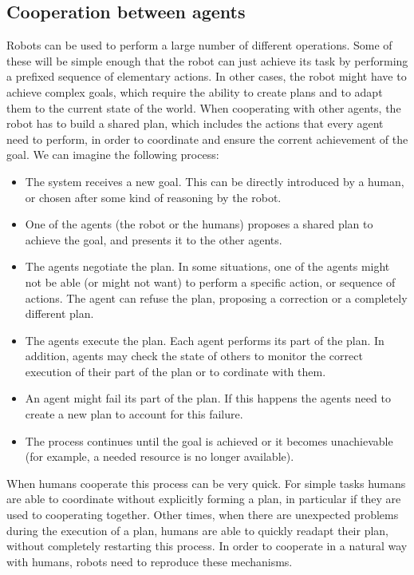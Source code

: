\subsection{Cooperation between agents}
Robots can be used to perform a large number of different operations. Some of these will be simple enough that the robot can just achieve its task by performing a prefixed sequence of elementary actions. In other cases, the robot might have to achieve complex goals, which require the ability to create plans and to adapt them to the current state of the world. When cooperating with other agents, the robot has to build a shared plan, which includes the actions that every agent need to perform, in order to coordinate and ensure the corrent achievement of the goal. We can imagine the following process:
\begin{itemize}
	\item The system receives a new goal. This can be directly introduced by a human, or chosen after some kind of reasoning by the robot.
	\item One of the agents (the robot or the humans) proposes a shared plan to achieve the goal, and presents it to the other agents.
	\item The agents negotiate the plan. In some situations, one of the agents might not be able (or might not want) to perform a specific action, or sequence of actions. The agent can refuse the plan, proposing a correction or a completely different plan.
	\item The agents execute the plan. Each agent performs its part of the plan. In addition, agents may check the state of others to monitor the correct execution of their part of the plan or to cordinate with them.
	\item An agent might fail its part of the plan. If this happens the agents need to create a new plan to account for this failure.
 	\item The process continues until the goal is achieved or it becomes unachievable (for example, a needed resource is no longer available).
\end{itemize} 
When humans cooperate this process can be very quick. For simple tasks humans are able to coordinate without explicitly forming a plan, in particular if they are used to cooperating together. Other times, when there are unexpected problems during the execution of a plan, humans are able to quickly readapt their plan, without completely restarting this process. In order to cooperate in a natural way with humans, robots need to reproduce these mechanisms.

